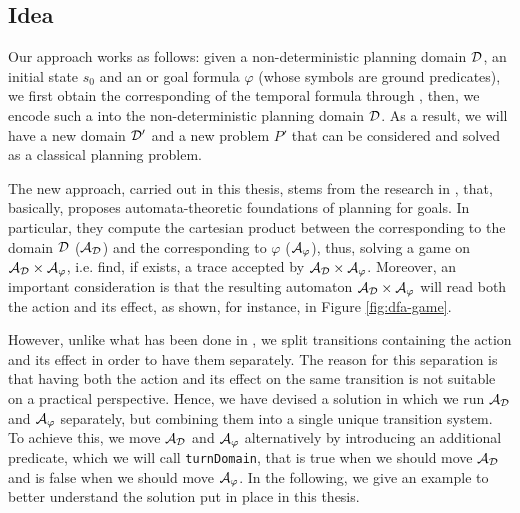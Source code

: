 \subsection{Idea}
Our \FONDFOR approach works as follows: given a non-deterministic planning domain $\mathcal{D}$, an initial state $s_0$ and an \LTLf or \PLTL goal formula $\varphi$ (whose symbols are ground predicates), we first obtain the corresponding \DFA of the temporal formula through \LTLfToDFA, then, we encode such a \DFA into the non-deterministic planning domain $\mathcal{D}$. As a result, we will have a new domain $\mathcal{D}'$ and a new problem $P'$ that can be considered and solved as a classical \FOND planning problem. 

The new approach, carried out in this thesis, stems from the research in \cite{de2018automata}, that, basically, proposes automata-theoretic foundations of \FOND planning for \LTLf goals. In particular, they compute the cartesian product between the \DFA corresponding to the domain $\mathcal{D}$ ($\mathcal{A}_{\mathcal{D}}$) and the \DFA corresponding to $\varphi$ ($\mathcal{A}_\varphi$), thus, solving a \DFA game on $\mathcal{A}_{\mathcal{D}} \times \mathcal{A}_\varphi$, i.e. find, if exists, a trace accepted by $\mathcal{A}_{\mathcal{D}} \times \mathcal{A}_\varphi$. Moreover, an important consideration is that the resulting automaton $\mathcal{A}_{\mathcal{D}} \times \mathcal{A}_\varphi$ will read both the action and its effect, as shown, for instance, in Figure \ref{fig:dfa-game}.

However, unlike what has been done in \cite{de2018automata}, we split transitions containing the action and its effect in order to have them separately. The reason for this separation is that having both the action and its effect on the same transition is not suitable on a practical perspective. Hence, we have devised a solution in which we run $\mathcal{A}_{\mathcal{D}}$ and $\mathcal{A}_\varphi$ separately, but combining them into a single unique transition system. To achieve this, we move $\mathcal{A}_{\mathcal{D}}$ and $\mathcal{A}_\varphi$ alternatively by introducing an additional predicate, which we will call \texttt{turnDomain}, that is true when we should move $\mathcal{A}_{\mathcal{D}}$ and is false when we should move $\mathcal{A}_\varphi$. In the following, we give an example to better understand the solution put in place in this thesis.

